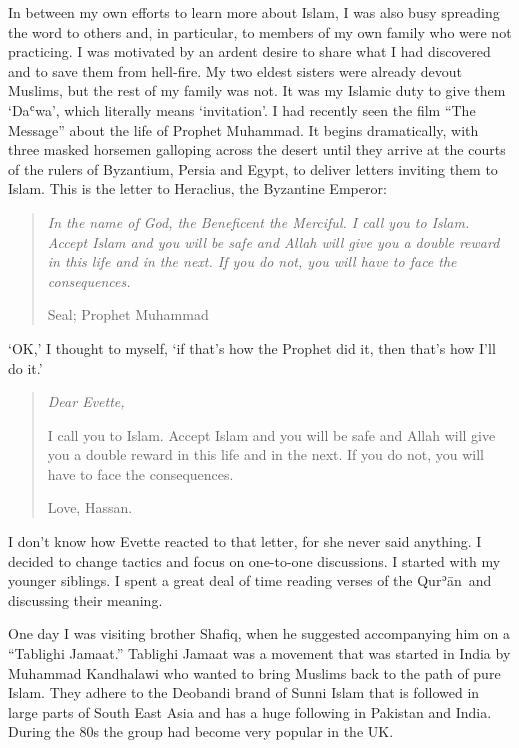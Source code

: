 \documentclass[12pt]{memoir}
\def\´{ʾ} %
\def\`{ʿ} %
\newcommand{\cor}[2]{#2} %
\def \Quran{Qur\-\´ān} %
\begin{document}
In between my own efforts to learn more about Islam,
I was also busy spreading the word to others and, in particular,
to members of my own family who were not practicing.
I was motivated by an ardent desire to share what I had discovered
and to save them from hell-fire.
My two eldest sisters were already devout Muslims,
but the rest of my family was not.
It was my Islamic duty to give them ‘Da\`wa’,
which literally means ‘invitation’.
I had recently seen the film “The Message” about the life of Prophet Muhammad.
It begins dramatically, with three masked horsemen galloping across the desert
until they arrive at the courts of the rulers of Byzantium,
Persia and Egypt, to deliver letters inviting them to Islam.
This is the letter to Heraclius, the Byzantine Emperor:

\begin{quote}
\itshape
In the name of God, the Beneficent the Merciful.
I call you to Islam.
Accept Islam and you will be safe
and Allah will give you a double reward in this life and in the next.
If you do not, you will have to face the consequences.

Seal; Prophet Muhammad
\end{quote}

‘OK,’ I thought to myself, ‘if that’s how the Prophet did it,
then that’s how I’ll do it.’

\begin{quote}
\itshape
Dear Evette,

I call you to Islam. Accept Islam and you will be safe
and Allah will give you a double reward in this life and in the next.
If you do not, you will have to face the consequences.

Love, Hassan.
\end{quote}

I don’t know how Evette reacted to that letter, for she never said anything.
I decided to change tactics and focus on one-to-one discussions.
I started with my younger siblings.
I spent a great deal of time reading verses of the \Quran\
and discussing their meaning.


One day I was visiting brother Shafiq,
when he suggested accompanying him on a “Tablighi Jamaat.”
Tablighi Jamaat was a movement that \cor{started}{was started}
in India by Muhammad Kandhalawi who wanted to bring Muslims
back to the path of pure Islam.
They adhere to the Deobandi brand of Sunni Islam that is followed
in large parts of South East Asia
and has a huge following in Pakistan and India.
During the 80s the group had become very popular in the UK.
\end{document}

